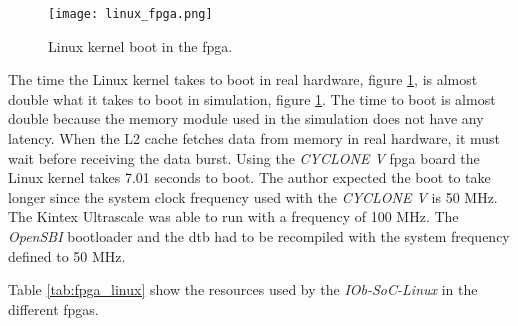 \begin{figure}[!ht]
    \centering
    \texttt{[image: linux\_fpga.png]}
    \caption{Linux kernel boot in the \acrshort{fpga}.}
    \label{fig:linux_fpga}
\end{figure}

The time the Linux kernel takes to boot in real hardware, figure \ref{fig:linux_fpga}, is almost double what it takes to boot in simulation, figure \ref{fig:linux_fpga}. The time to boot is almost double because the memory module used in the simulation does not have any latency. When the L2 cache fetches data from memory in real hardware, it must wait before receiving the data burst. Using the \textit{CYCLONE V} \acrshort{fpga} board the Linux kernel takes 7.01 seconds to boot. The author expected the boot to take longer since the system clock frequency used with the \textit{CYCLONE V} is 50 MHz. The Kintex Ultrascale was able to run with a frequency of 100 MHz. The \textit{OpenSBI} bootloader and the \acrlong{dtb} had to be recompiled with the system frequency defined to 50 MHz.

Table \ref{tab:fpga_linux} show the resources used by the \textit{IOb-SoC-Linux} in the different \acrshort{fpga}s.

